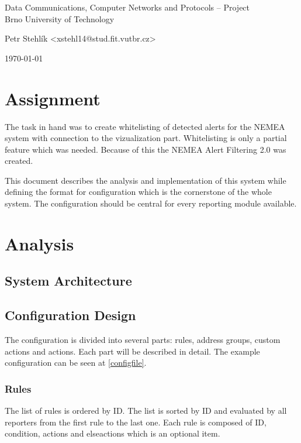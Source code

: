 \documentclass[11pt,a4paper]{article}
\begin{document}
\begin{center}
	\LARGE{Data Communications, Computer Networks and Protocols -- Project}\\
	\large{Brno University of Technology}
	\vspace{0.5cm}

	Petr Stehlík <xstehl14@stud.fit.vutbr.cz>

	\vspace{0.2cm}

	\today

\end{center}

\section{Assignment}
The task in hand was to create whitelisting of detected alerts for the NEMEA system with connection to the vizualization part. Whitelisting is only a partial feature which was needed. Because of this the NEMEA Alert Filtering 2.0 was created.

This document describes the analysis and implementation of this system while defining the format for configuration which is the cornerstone of the whole system. The configuration should be central for every reporting module available.

\section{Analysis}
\subsection{System Architecture}

\subsection{Configuration Design}
The configuration is divided into several parts: rules, address groups, custom actions and actions. Each part will be described in detail. The example configuration can be seen at \ref{configfile}.

\subsubsection{Rules}
The list of rules is ordered by ID. The list is sorted by ID and evaluated by all reporters from the first rule to the last one. Each rule is composed of ID, condition, actions and elseactions which is an optional item.
\end{document}
